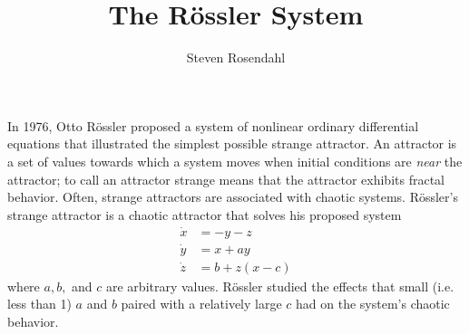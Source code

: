 \documentclass{article}
\title{The R\"{o}ssler System}
\author{Steven Rosendahl}
\date{}
\begin{document}
\maketitle

In 1976, Otto R\"{o}ssler proposed a system of nonlinear ordinary differential equations that illustrated the simplest possible strange attractor. An attractor is a set of values towards which a system moves when initial conditions are \textit{near} the attractor; to call an attractor strange means that the attractor exhibits fractal behavior. Often, strange attractors are associated with chaotic systems. R\"{o}ssler's strange attractor is a chaotic attractor that solves his proposed system
\begin{align}
    \dot{x} &= -y-z\\
    \dot{y} &= x+ay\\
    \dot{z} &= b+z(x-c)
\end{align}
where $a,b,$ and $c$ are arbitrary values. R\"{o}ssler studied the effects that small (i.e. less than 1) $a$ and $b$ paired with a relatively large $c$ had on the system's chaotic behavior.
\end{document}
